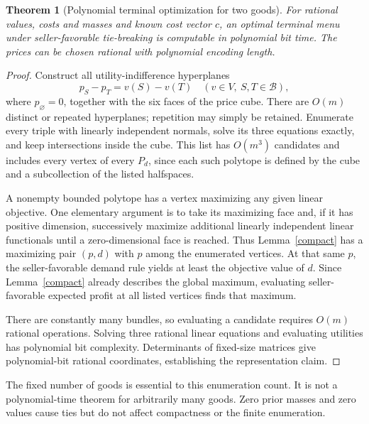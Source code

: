 \documentclass[11pt]{article}
\newtheorem{theorem}{Theorem}
\theoremstyle{remark}
\begin{document}
\begin{theorem}[Polynomial terminal optimization for two goods]\label{terminal}
For rational values, costs and masses and known cost vector $c$, an optimal terminal menu under seller-favorable tie-breaking is computable in polynomial bit time. The prices can be chosen rational with polynomial encoding length.
\end{theorem}
\begin{proof}
Construct all utility-indifference hyperplanes
\[
 p_S-p_T=v(S)-v(T)
 \quad(v\in V,\ S,T\in\mathcal B),
\]
where $p_\varnothing=0$, together with the six faces of the price cube. There are $O(m)$ distinct or repeated hyperplanes; repetition may simply be retained. Enumerate every triple with linearly independent normals, solve its three equations exactly, and keep intersections inside the cube. This list has $O(m^3)$ candidates and includes every vertex of every $P_d$, since each such polytope is defined by the cube and a subcollection of the listed halfspaces.

A nonempty bounded polytope has a vertex maximizing any given linear objective. One elementary argument is to take its maximizing face and, if it has positive dimension, successively maximize additional linearly independent linear functionals until a zero-dimensional face is reached. Thus Lemma~\ref{compact} has a maximizing pair $(p,d)$ with $p$ among the enumerated vertices. At that same $p$, the seller-favorable demand rule yields at least the objective value of $d$. Since Lemma~\ref{compact} already describes the global maximum, evaluating seller-favorable expected profit at all listed vertices finds that maximum.

There are constantly many bundles, so evaluating a candidate requires $O(m)$ rational operations. Solving three rational linear equations and evaluating utilities has polynomial bit complexity. Determinants of fixed-size matrices give polynomial-bit rational coordinates, establishing the representation claim.
\end{proof}

The fixed number of goods is essential to this enumeration count. It is not a polynomial-time theorem for arbitrarily many goods. Zero prior masses and zero values cause ties but do not affect compactness or the finite enumeration.
\end{document}
